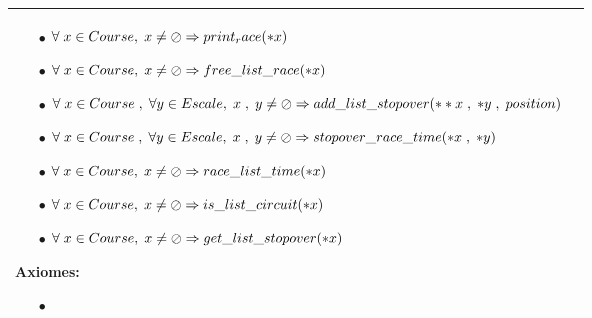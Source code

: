 \documentclass[a4paper, 11pt, oneside]{article}
\begin{document}
\begin{tabular}{|p{17cm}|c}
\begin{itemize}
						\item[$\bullet$] $\forall \hspace{1mm} x \in Course,\hspace{1mm} x \neq \oslash \Rightarrow  print_race(*x)$
						\item[$\bullet$] $\forall \hspace{1mm} x \in Course,\hspace{1mm} x \neq \oslash \Rightarrow  free\_list\_race(*x)$
						\item[$\bullet$] $\forall \hspace{1mm} x \in Course \hspace{1mm},\hspace{1mm} \forall y \in Escale, \hspace{1mm} x \hspace{1mm} , \hspace{1mm} y  \neq \oslash  \Rightarrow  add\_list\_stopover(**x \hspace{1mm} , \hspace{1mm} *y \hspace{1mm} , \hspace{1mm} position)$
						\item[$\bullet$] $\forall \hspace{1mm} x \in Course \hspace{1mm},\hspace{1mm} \forall y \in Escale, \hspace{1mm} x \hspace{1mm} , \hspace{1mm} y  \neq \oslash  \Rightarrow  stopover\_race\_time(*x \hspace{1mm} , \hspace{1mm} *y)$
						\item[$\bullet$] $\forall \hspace{1mm} x \in Course,\hspace{1mm} x \neq \oslash \Rightarrow  race\_list\_time(*x)$
						\item[$\bullet$] $\forall \hspace{1mm} x \in Course,\hspace{1mm} x \neq \oslash \Rightarrow  is\_list\_circuit(*x)$
						\item[$\bullet$] $\forall \hspace{1mm} x \in Course,\hspace{1mm} x \neq \oslash \Rightarrow  get\_list\_stopover(*x)$
					\end{itemize}

				\textbf{Axiomes:}
					\begin{itemize}
						\item[$\bullet$]
					\end{itemize}

				\\
				\hline
			\end{tabular}
\end{document}
